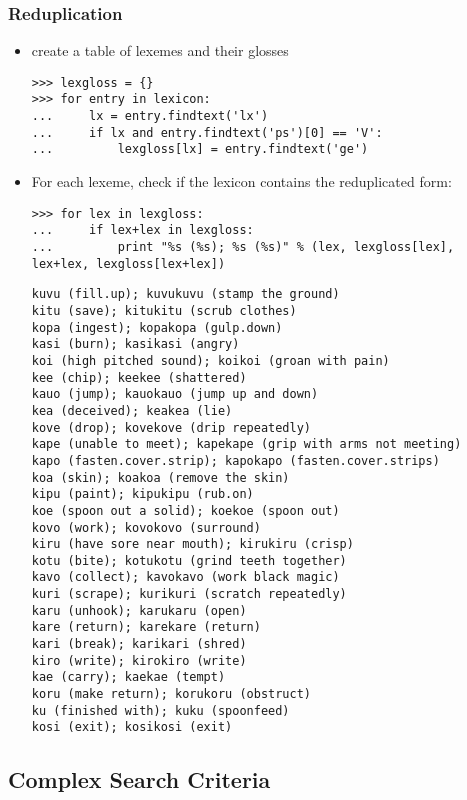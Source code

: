 \documentclass{beamer}             %
\begin{document}
\begin{frame}[fragile]
\frametitle{Reduplication}
\scriptsize
\begin{itemize}
\item create a table of lexemes and their glosses

\begin{verbatim}
>>> lexgloss = {}
>>> for entry in lexicon:
...     lx = entry.findtext('lx')
...     if lx and entry.findtext('ps')[0] == 'V':
...         lexgloss[lx] = entry.findtext('ge')
\end{verbatim}

\item For each lexeme, check if the lexicon contains the reduplicated form:

\begin{verbatim}
>>> for lex in lexgloss:
...     if lex+lex in lexgloss:
...         print "%s (%s); %s (%s)" % (lex, lexgloss[lex], lex+lex, lexgloss[lex+lex])
\end{verbatim}

\tiny
\begin{verbatim}
kuvu (fill.up); kuvukuvu (stamp the ground)
kitu (save); kitukitu (scrub clothes)
kopa (ingest); kopakopa (gulp.down)
kasi (burn); kasikasi (angry)
koi (high pitched sound); koikoi (groan with pain)
kee (chip); keekee (shattered)
kauo (jump); kauokauo (jump up and down)
kea (deceived); keakea (lie)
kove (drop); kovekove (drip repeatedly)
kape (unable to meet); kapekape (grip with arms not meeting)
kapo (fasten.cover.strip); kapokapo (fasten.cover.strips)
koa (skin); koakoa (remove the skin)
kipu (paint); kipukipu (rub.on)
koe (spoon out a solid); koekoe (spoon out)
kovo (work); kovokovo (surround)
kiru (have sore near mouth); kirukiru (crisp)
kotu (bite); kotukotu (grind teeth together)
kavo (collect); kavokavo (work black magic)
kuri (scrape); kurikuri (scratch repeatedly)
karu (unhook); karukaru (open)
kare (return); karekare (return)
kari (break); karikari (shred)
kiro (write); kirokiro (write)
kae (carry); kaekae (tempt)
koru (make return); korukoru (obstruct)
ku (finished with); kuku (spoonfeed)
kosi (exit); kosikosi (exit)
\end{verbatim}
\end{itemize}
\end{frame}

\subsection{Complex Search Criteria}
\end{document}

